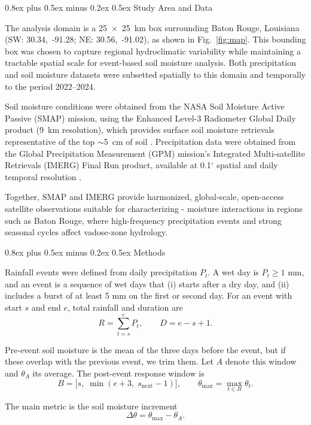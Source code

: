 \documentclass[9pt, twocolumn]{extarticle}
\makeatletter
\renewcommand\section{\@startsection{section}{1}{0pt}%
  {0.8ex plus 0.5ex minus 0.2ex}%
  {0.5ex}%
  {\normalfont\Large\bfseries}}
\makeatother
\begin{document}
\section{Study Area and Data}

The analysis domain is a 25~$\times$~25~km box surrounding Baton Rouge, Louisiana (SW: 30.34,~-91.28; NE: 30.56,~-91.02), as shown in Fig.~\ref{fig:map}. This bounding box was chosen to capture regional hydroclimatic variability while maintaining a tractable spatial scale for event-based soil moisture analysis. Both precipitation and soil moisture datasets were subsetted spatially to this domain and temporally to the period 2022--2024.

Soil moisture conditions were obtained from the NASA Soil Moisture Active Passive (SMAP) mission, using the Enhanced Level-3 Radiometer Global Daily product (9~km resolution), which provides surface soil moisture retrievals representative of the top $\sim$5~cm of soil \cite{smap}. Precipitation data were obtained from the Global Precipitation Measurement (GPM) mission's Integrated Multi-satellite Retrievals (IMERG) Final Run product, available at 0.1$^{\circ}$ spatial and daily temporal resolution \cite{imergdp}.

Together, SMAP and IMERG provide harmonized, global-scale, open-access satellite observations suitable for characterizing - moisture interactions in regions such as Baton Rouge, where high-frequency precipitation events and strong seasonal cycles affect vadose-zone hydrology.


\section{Methods}

Rainfall events were defined from daily precipitation \(P_t\). A wet day is \(P_t \geq 1\) mm, and an event is a sequence of wet days that (i) starts after a dry day, and (ii) includes a burst of at least 5 mm on the first or second day. For an event with start \(s\) and end \(e\), total rainfall and duration are  
\[
R = \sum_{t=s}^{e} P_t, 
\qquad 
D = e - s + 1.
\]

Pre-event soil moisture is the mean of the three days before the event, but if these overlap with the previous event, we trim them. Let \(A\) denote this window and \(\theta_A\) its average. The post-event response window is
\[
B = \big[s,\; \min(e+3,\; s_{\mathrm{next}}-1)\big],
\qquad 
\theta_{\max} = \max_{t \in B} \theta_t .
\]

The main metric is the soil moisture increment  
\[
\Delta \theta = \theta_{\max} - \theta_A .
\]
\end{document}
